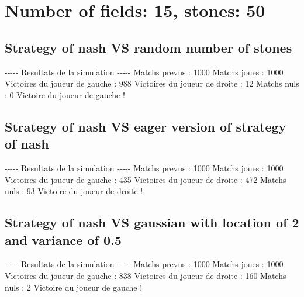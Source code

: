 \documentclass{article}%
\begin{document}
%
\section{Number of fields: 15, stones: 50}%
\label{sec:Number of fields 15, stones 50}%
\subsection{Strategy of nash VS random number of stones}%
\label{subsec:Strategy of nash VS random number of stones}%
{-}{-}{-}{-}{-} Resultats de la simulation {-}{-}{-}{-}{-}\newline%
		\newline%
Matchs prevus : 1000\newline%
Matchs joues : 1000\newline%
\newline%
Victoires du joueur de gauche : 988\newline%
Victoires du joueur de droite : 12\newline%
Matchs nuls : 0\newline%
\newline%
Victoire du joueur de gauche !

%
\subsection{Strategy of nash VS eager version of strategy of nash}%
\label{subsec:Strategy of nash VS eager version of strategy of nash}%
{-}{-}{-}{-}{-} Resultats de la simulation {-}{-}{-}{-}{-}\newline%
		\newline%
Matchs prevus : 1000\newline%
Matchs joues : 1000\newline%
\newline%
Victoires du joueur de gauche : 435\newline%
Victoires du joueur de droite : 472\newline%
Matchs nuls : 93\newline%
\newline%
Victoire du joueur de droite !

%
\subsection{Strategy of nash VS gaussian with location of 2 and variance of 0.5}%
\label{subsec:Strategy of nash VS gaussian with location of 2 and variance of 0.5}%
{-}{-}{-}{-}{-} Resultats de la simulation {-}{-}{-}{-}{-}\newline%
		\newline%
Matchs prevus : 1000\newline%
Matchs joues : 1000\newline%
\newline%
Victoires du joueur de gauche : 838\newline%
Victoires du joueur de droite : 160\newline%
Matchs nuls : 2\newline%
\newline%
Victoire du joueur de gauche !
\end{document}

